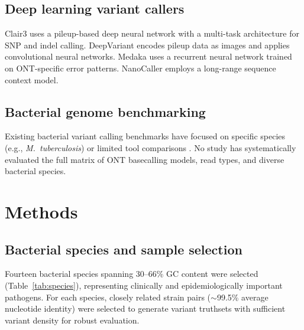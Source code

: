 \documentclass[11pt]{article}
\begin{document}
\subsection{Deep learning variant callers}
Clair3 \citep{zheng2022} uses a pileup-based deep neural network with a multi-task architecture for SNP and indel calling. DeepVariant \citep{poplin2018} encodes pileup data as images and applies convolutional neural networks. Medaka \citep{medaka2023} uses a recurrent neural network trained on ONT-specific error patterns. NanoCaller \citep{ahsan2021} employs a long-range sequence context model.

\subsection{Bacterial genome benchmarking}
Existing bacterial variant calling benchmarks have focused on specific species (e.g., \textit{M.\ tuberculosis}) or limited tool comparisons \citep{bush2020,dePristo2011}. No study has systematically evaluated the full matrix of ONT basecalling models, read types, and diverse bacterial species.

\section{Methods}

\subsection{Bacterial species and sample selection}
Fourteen bacterial species spanning 30--66\% GC content were selected (Table~\ref{tab:species}), representing clinically and epidemiologically important pathogens. For each species, closely related strain pairs ($\sim$99.5\% average nucleotide identity) were selected to generate variant truthsets with sufficient variant density for robust evaluation.
\end{document}
